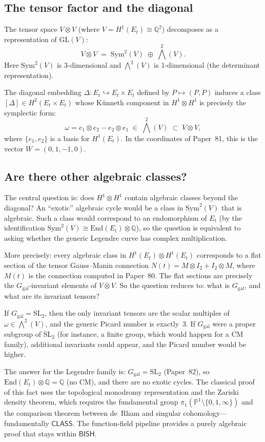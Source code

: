 \documentclass[11pt]{article}
\theoremstyle{plain}
\theoremstyle{definition}
\theoremstyle{remark}
\newcommand{\Q}{\mathbb{Q}}
\newcommand{\GL}{\mathrm{GL}}
\newcommand{\SL}{\mathrm{SL}}
\newcommand{\End}{\mathrm{End}}
\newcommand{\Sym}{\mathrm{Sym}}
\newcommand{\Ggal}{G_{\mathrm{gal}}}
\newcommand{\BISH}{\mathsf{BISH}}
\newcommand{\CLASS}{\mathsf{CLASS}}
\begin{document}
\subsection{The tensor factor and the diagonal}

The tensor space $V \otimes V$ (where $V = H^1(E_t) \cong \Q^2$) decomposes as a representation of $\GL(V)$:
\[
  V \otimes V \;=\; \Sym^2(V) \;\oplus\; \textstyle\bigwedge^2(V).
\]
Here $\Sym^2(V)$ is 3-dimensional and $\bigwedge^2(V)$ is 1-dimensional (the determinant representation).

The diagonal embedding $\Delta : E_t \hookrightarrow E_t \times E_t$ defined by $P \mapsto (P, P)$ induces a class $[\Delta] \in H^2(E_t \times E_t)$ whose K\"unneth component in $H^1 \otimes H^1$ is precisely the symplectic form:
\[
  \omega = e_1 \otimes e_2 - e_2 \otimes e_1 \;\in\; \textstyle\bigwedge^2(V) \;\subset\; V \otimes V,
\]
where $\{e_1, e_2\}$ is a basis for $H^1(E_t)$.
In the coordinates of Paper~81, this is the vector $W = (0, 1, -1, 0)$.

\subsection{Are there other algebraic classes?}

The central question is: does $H^1 \otimes H^1$ contain algebraic classes beyond the diagonal?
An ``exotic'' algebraic cycle would be a class in $\Sym^2(V)$ that is algebraic.
Such a class would correspond to an endomorphism of $E_t$ (by the identification $\Sym^2(V) \cong \End(E_t) \otimes \Q$), so the question is equivalent to asking whether the generic Legendre curve has complex multiplication.

More precisely: every algebraic class in $H^1(E_t) \otimes H^1(E_t)$ corresponds to a flat section of the tensor Gauss--Manin connection $N(t) = M \otimes I_2 + I_2 \otimes M$, where $M(t)$ is the connection computed in Paper~80.
The flat sections are precisely the $\Ggal$-invariant elements of $V \otimes V$.
So the question reduces to: what is $\Ggal$, and what are its invariant tensors?

If $\Ggal = \SL_2$, then the only invariant tensors are the scalar multiples of $\omega \in \bigwedge^2(V)$, and the generic Picard number is exactly~3.
If $\Ggal$ were a proper subgroup of $\SL_2$ (for instance, a finite group, which would happen for a CM family), additional invariants could appear, and the Picard number would be higher.

The answer for the Legendre family is: $\Ggal = \SL_2$ (Paper~82), so $\End(E_t) \otimes \Q = \Q$ (no CM), and there are no exotic cycles.
The classical proof of this fact uses the topological monodromy representation and the Zariski density theorem, which requires the fundamental group $\pi_1(\mathbb{P}^1 \setminus \{0, 1, \infty\})$ and the comparison theorem between de~Rham and singular cohomology---fundamentally $\CLASS$.
The function-field pipeline provides a purely algebraic proof that stays within $\BISH$.
\end{document}
